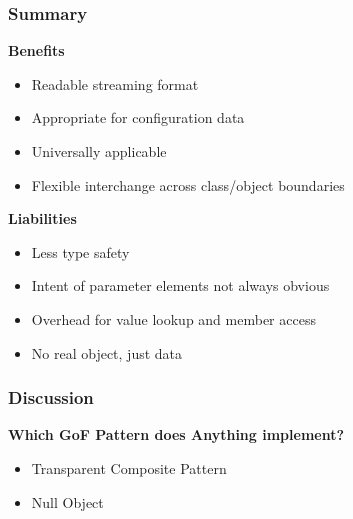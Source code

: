 \subsubsection{Summary}
\textbf{Benefits}
\begin{itemize}
    \item Readable streaming format
    \item Appropriate for configuration data
    \item Universally applicable
    \item Flexible interchange across class/object boundaries
\end{itemize}
\textbf{Liabilities}
\begin{itemize}
    \item Less type safety
    \item Intent of parameter elements not always obvious
    \item Overhead for value lookup and member access
    \item No real object, just data
\end{itemize}
\subsubsection{Discussion}
\textbf{Which GoF Pattern does Anything implement?}
\begin{itemize}
    \item Transparent Composite Pattern
    \item Null Object
\end{itemize}
